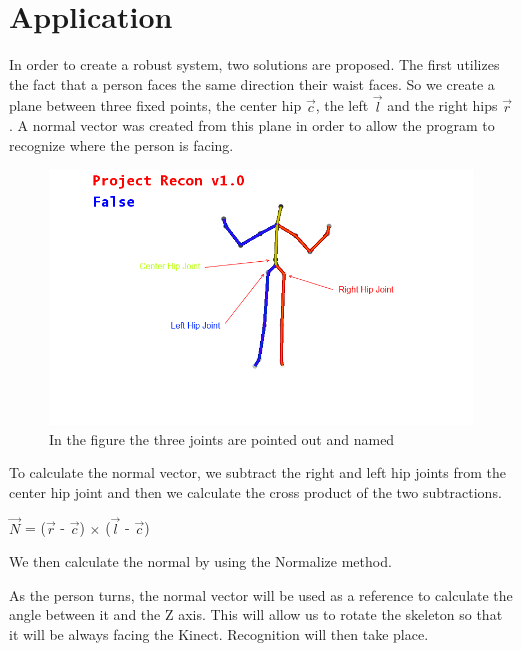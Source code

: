 \chapter{Application}\label{chap:application}
In order to create a robust system, two solutions are proposed. The first utilizes the fact that a person faces 
the same direction their waist faces. So we create a plane between three fixed 
points, the center hip $\vec{c}$, the left $\vec{l}$ and the right hips $\vec{r}$. A normal vector \N was created 
from this plane in order to allow the program to recognize where the person is 
facing.

\begin{figure}[!htbp]
\centering
\includegraphics[width=1\textwidth]{images/skeleton_frame3.png}
\caption{In the figure the three joints are pointed out and named}
\label{skeletonframe3}
\end{figure}

To calculate the normal vector, we subtract the right and left hip joints from 
the center hip joint and then we calculate the cross product of the two 
subtractions.

$\vec{N}$ = ($\vec{r}$ - $\vec{c}$) $\times$ ($\vec{l}$ - $\vec{c}$)

We then calculate the normal by using the Normalize method.



As the person turns, the normal vector will be used as a reference to calculate the angle between it and the Z axis. This will allow us to rotate the skeleton so that it will be always facing the Kinect. Recognition will then take place.

